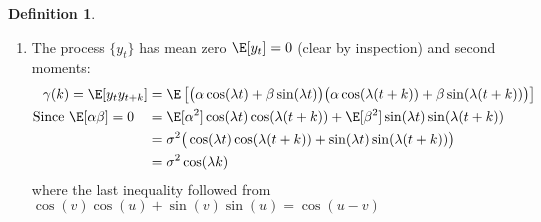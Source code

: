 \documentclass[12pt]{article}
\theoremstyle{plain}
\theoremstyle{definition}
\newtheorem{defn}[thm]{Definition}
\theoremstyle{remark}
\begin{document}
\begin{defn}
\begin{enumerate}[label=(\roman*)]
  \item The process $\{y_t\}$ has mean zero $\E[y_t]=0$ (clear by
    inspection) and second moments:
    \begin{align*}
      \gamma(k) = \E[y_ty_{t+k}]
        &=
        \E\left[
          \big(
          \alpha \cos(\lambda t)+\beta \sin(\lambda t)
          \big)
          \big(
          \alpha \cos(\lambda (t+k))+\beta \sin(\lambda (t+k))
          \big)
        \right] \\
        \text{Since $\E[\alpha\beta]=0$}\quad
        &=
        \E[\alpha^2]
        \cos(\lambda t)\cos(\lambda (t+k))
        +
        \E[\beta^2]
        \sin(\lambda t)\sin(\lambda (t+k))
        \\
        &=
        \sigma^2
        \big(
        \cos(\lambda t)\cos(\lambda (t+k))
        + \sin(\lambda t)\sin(\lambda (t+k))
        \big)
        \\
        &=
        \sigma^2
        \cos(\lambda k)
    \end{align*}
    where the last inequality followed from
    $\cos(v)\cos(u) + \sin(v)\sin(u) =\cos(u-v)$


\end{enumerate}
\end{defn}
\end{document}
